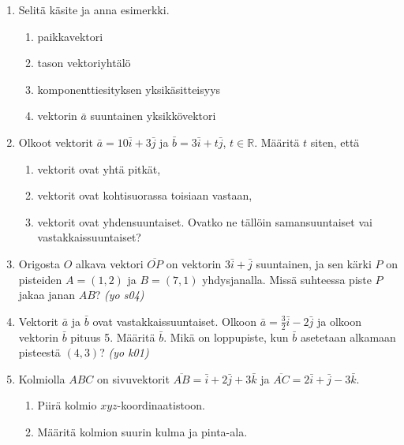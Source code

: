 \documentclass[12pt,fleqn]{article}
\begin{document}
\begin{enumerate}[label=\textbf{\arabic*.}]
\item Selitä käsite ja anna esimerkki.
\begin{enumerate}[label=\textbf{\alph*)}]
\item paikkavektori
\item tason vektoriyhtälö
\item komponenttiesityksen yksikäsitteisyys
\item vektorin \(\bar{a}\) suuntainen yksikkövektori
\end{enumerate}

\item Olkoot vektorit \(\bar{a}=10\bar{i}+3\bar{j}\) ja \(\bar{b}=3\bar{i}+t\bar{j}\), \(t \in \mathbb{R}\). Määritä \(t\) siten, että
\begin{enumerate}[label=\textbf{\alph*)}]
\item vektorit ovat yhtä pitkät,
\item vektorit ovat kohtisuorassa toisiaan vastaan,
\item vektorit ovat yhdensuuntaiset. Ovatko ne tällöin samansuuntaiset vai vastakkaissuuntaiset?
\end{enumerate}

\item Origosta \(O\) alkava vektori \(\overline{OP}\) on vektorin \(3\bar{i}+\bar{j}\) suuntainen, ja sen kärki \(P\) on pisteiden \(A=(1,2)\) ja \(B=(7,1)\) yhdysjanalla. Missä suhteessa piste \(P\) jakaa janan \(AB\)?\emph{ (yo s04)}

\item Vektorit \(\bar{a}\) ja \(\bar{b}\) ovat vastakkaissuuntaiset. Olkoon \(\bar{a}=\frac{3}{2}\bar{i}-2\bar{j}\) ja olkoon vektorin \(\bar{b}\) pituus 5. Määritä \(\bar{b}\). Mikä on loppupiste, kun \(\bar{b}\) asetetaan alkamaan pisteestä \((4,3)\)? \emph{(yo k01)}

\item Kolmiolla \(ABC\) on sivuvektorit \(\overline{AB}=\bar{i}+2\bar{j}+3\bar{k}\) ja \(\overline{AC}=2\bar{i}+\bar{j}-3\bar{k}\). 
\begin{enumerate}[label=\textbf{\alph*)}]
\item Piirä kolmio \(xyz\)-koordinaatistoon.
\item Määritä kolmion suurin kulma ja pinta-ala.
\end{enumerate}


\end{enumerate}
\end{document}
